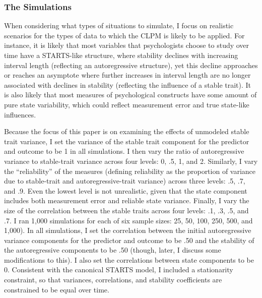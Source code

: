 \documentclass[
  english,
  man,floatsintext]{apa6}
\begin{document}
\hypertarget{the-simulations}{%
\subsubsection{The Simulations}\label{the-simulations}}

When considering what types of situations to simulate, I focus on realistic scenarios for the types of data to which the CLPM is likely to be applied. For instance, it is likely that most variables that psychologists choose to study over time have a STARTS-like structure, where stability declines with increasing interval length (reflecting an autoregressive structure), yet this decline approaches or reaches an asymptote where further increases in interval length are no longer associated with declines in stability (reflecting the influence of a stable trait). It is also likely that most measures of psychological constructs have some amount of pure state variability, which could reflect measurement error and true state-like influences.

Because the focus of this paper is on examining the effects of unmodeled stable trait variance, I set the variance of the stable trait component for the predictor and outcome to be 1 in all simulations. I then vary the ratio of autoregressive variance to stable-trait variance across four levels: 0, .5, 1, and 2. Similarly, I vary the ``reliability'' of the measures (defining reliability as the proportion of variance due to stable-trait and autoregressive-trait variance) across three levels: .5, .7, and .9. Even the lowest level is not unrealistic, given that the state component includes both measurement error and reliable state variance. Finally, I vary the size of the correlation between the stable traits across four levels: .1, .3, .5, and .7. I ran 1,000 simulations for each of six sample sizes: 25, 50, 100, 250, 500, and 1,000). In all simulations, I set the correlation between the initial autoregressive variance components for the predictor and outcome to be .50 and the stability of the autoregressive components to be .50 (though, later, I discuss some modifications to this). I also set the correlations between state components to be 0. Consistent with the canonical STARTS model, I included a stationarity constraint, so that variances, correlations, and stability coefficients are constrained to be equal over time.
\end{document}

